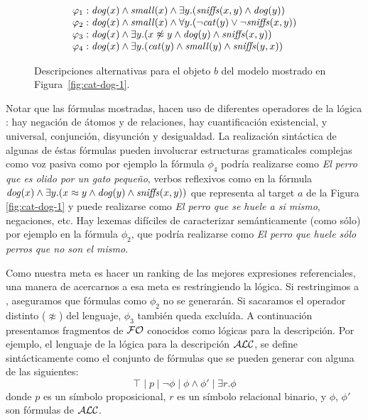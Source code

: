 \begin{figure}[h]
$$
\begin{array}{ll}
 \varphi_1:  \mathit{dog}(x) \land \mathit{small}(x) \land
   \exists y . (\mathit{sniffs}(x,y) \land \mathit{dog}(y))\\
  \varphi_2:  \mathit{dog}(x) \land \mathit{small}(x) \land
  \forall y . (\neg \mathit{cat}(y) \lor \neg \mathit{sniffs}(x,y))\\
  \varphi_3:  \mathit{dog}(x) \land
  \exists y . (x \not\approx y \land \mathit{dog}(y)  \land \mathit{sniffs}(x,y))\\
  \varphi_4:  \mathit{dog}(x) \land
  \exists y . (\mathit{cat}(y) \land \mathit{small}(y) \land \mathit{sniffs}(y,x))
 \end{array}
$$
\caption{Descripciones alternativas para el objeto $b$ del modelo mostrado en Figura~\protect\ref{fig:cat-dog-1}.}\label{tab:gammas}
\end{figure}

Notar que las f\'ormulas mostradas, hacen uso de diferentes operadores de la l\'ogica \FOL: hay negaci\'on de \'atomos y de relaciones, hay cuantificaci\'on existencial, y universal, conjunci\'on, disyunci\'on y desigualdad. La realizaci\'on sint\'actica de algunas de \'estas f\'ormulas pueden involucrar estructuras gramaticales complejas como voz pasiva como por ejemplo la f\'ormula $\phi_4$ podr\'ia realizarse como {\it El perro que es olido por un gato peque\~no}, verbos reflexivos como en la f\'ormula $\mathit{dog}(x) \land \exists y . (x \approx y \land \mathit{dog}(y) \land \mathit{sniffs}(x,y))$ que representa al target $a$ de la Figura \ref{fig:cat-dog-1} y puede realizarse como {\it El perro que se huele a si mismo}, negaciones, etc. Hay lexemas dif\'iciles de caracterizar sem\'anticamente (como s\'olo) por ejemplo en la f\'ormula $\phi_2$, que podr\'ia realizarse como {\it El perro que huele s\'olo perros que no son el mismo}.
 
Como nuestra meta es hacer un ranking de las mejores expresiones referenciales, una manera de acercarnos a esa meta es restringiendo la l\'ogica. Si restringimos a \EPFOL, aseguramos que f\'ormulas como $\phi_2$ no se generar\'an. Si sacaramos el operador distinto ($\not\approx$) del lenguaje, $\phi_3$ tambi\'en queda exclu\'ida.
A continuaci\'on presentamos fragmentos de $\mathcal{FO}$ conocidos como l\'ogicas para la descripci\'on. Por ejemplo, el lenguaje de la l\'ogica para la descripci\'on $\mathcal{ALC}$, se define sint\'acticamente como el conjunto de f\'ormulas que se pueden generar con alguna de las siguientes:
$$
\top \mid p \mid \neg \phi \mid \phi \wedge \phi' \mid  \exists r. \phi
$$
donde $p$ es un s\'imbolo proposicional, $r$ es un s\'imbolo relacional binario, y $\phi$, $\phi'$ son f\'ormulas de $\mathcal{ALC}$.

